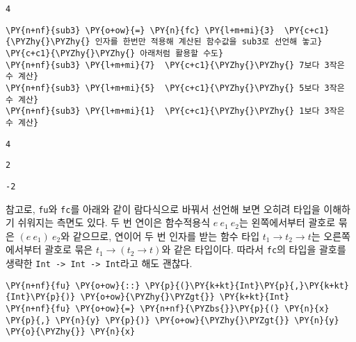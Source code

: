     
    \begin{Verbatim}[commandchars=\\\{\}]
4
    \end{Verbatim}

    
    \begin{tcolorbox}[breakable, size=fbox, boxrule=1pt, pad at break*=1mm,colback=cellbackground, colframe=cellborder, top=.75ex]
\begin{Verbatim}[commandchars=\\\{\}]
\PY{n+nf}{sub3} \PY{o+ow}{=} \PY{n}{fc} \PY{l+m+mi}{3}  \PY{c+c1}{\PYZhy{}\PYZhy{} 인자를 한번만 적용해 계산된 함수값을 sub3로 선언해 놓고}
\PY{c+c1}{\PYZhy{}\PYZhy{} 아래처럼 활용할 수도}
\PY{n+nf}{sub3} \PY{l+m+mi}{7}  \PY{c+c1}{\PYZhy{}\PYZhy{} 7보다 3작은 수 계산}
\PY{n+nf}{sub3} \PY{l+m+mi}{5}  \PY{c+c1}{\PYZhy{}\PYZhy{} 5보다 3작은 수 계산}
\PY{n+nf}{sub3} \PY{l+m+mi}{1}  \PY{c+c1}{\PYZhy{}\PYZhy{} 1보다 3작은 수 계산}
\end{Verbatim}
\end{tcolorbox}

    
    \begin{Verbatim}[commandchars=\\\{\}]
4
    \end{Verbatim}

    
    
    \begin{Verbatim}[commandchars=\\\{\}]
2
    \end{Verbatim}

    
    
    \begin{Verbatim}[commandchars=\\\{\}]
-2
    \end{Verbatim}

    
    \noindent 참고로, \texttt{fu}와 \texttt{fc}를 아래와 같이 람다식으로
바꿔서 선언해 보면 오히려 타입을 이해하기 쉬워지는 측면도 있다. 두 번
연이은 함수적용식 \(e~e_1~e_2\)는 왼쪽에서부터 괄호로 묶은
\((e~e_1)~e_2\)와 같으므로, 연이어 두 번 인자를 받는 함수 타입
\(t_1 \to t_2 \to t\)는 오른쪽에서부터 괄호로 묶은
\(t_1 \to (t_2 \to t)\)와 같은 타입이다. 따라서 \texttt{fc}의 타입을
괄호를 생략한
\texttt{Int\ -\textgreater{}\ Int\ -\textgreater{}\ Int}라고 해도
괜찮다.

    \begin{tcolorbox}[breakable, size=fbox, boxrule=1pt, pad at break*=1mm,colback=cellbackground, colframe=cellborder, top=.75ex]
\begin{Verbatim}[commandchars=\\\{\}]
\PY{n+nf}{fu} \PY{o+ow}{::} \PY{p}{(}\PY{k+kt}{Int}\PY{p}{,}\PY{k+kt}{Int}\PY{p}{)} \PY{o+ow}{\PYZhy{}\PYZgt{}} \PY{k+kt}{Int}
\PY{n+nf}{fu} \PY{o+ow}{=} \PY{n+nf}{\PYZbs{}}\PY{p}{(} \PY{n}{x} \PY{p}{,} \PY{n}{y} \PY{p}{)} \PY{o+ow}{\PYZhy{}\PYZgt{}} \PY{n}{y} \PY{o}{\PYZhy{}} \PY{n}{x}
\end{Verbatim}
\end{tcolorbox}

